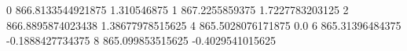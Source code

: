 0 866.8133544921875 1.310546875
1 867.2255859375 1.7227783203125
2 866.8895874023438 1.38677978515625
4 865.5028076171875 0.0
6 865.31396484375 -0.1888427734375
8 865.099853515625 -0.4029541015625
